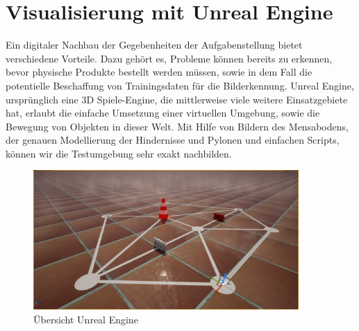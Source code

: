 \newpage
\section{Visualisierung mit Unreal Engine}
Ein digitaler Nachbau der Gegebenheiten der Aufgabenstellung bietet verschiedene Vorteile. Dazu gehört es, Probleme können bereits zu erkennen, bevor physische Produkte bestellt werden müssen, sowie in dem Fall die potentielle Beschaffung von Trainingsdaten für die Bilderkennung. Unreal Engine, ursprünglich eine 3D Spiele-Engine, die mittlerweise viele weitere Einsatzgebiete hat, erlaubt die einfache Umsetzung einer virtuellen Umgebung, sowie die Bewegung von Objekten in dieser Welt. Mit Hilfe von Bildern des Mensabodens, der genauen Modellierung der Hindernisse und Pylonen und einfachen Scripts, können wir die Testumgebung sehr exakt nachbilden.

\begin{figure}[h!]
            \centering
            \includegraphics[width=0.9\textwidth]{img/unrealengine/overview.png}
            \caption{Übersicht Unreal Engine}
        \label{img:Übersicht Unreal Engine}
        \end{figure}
